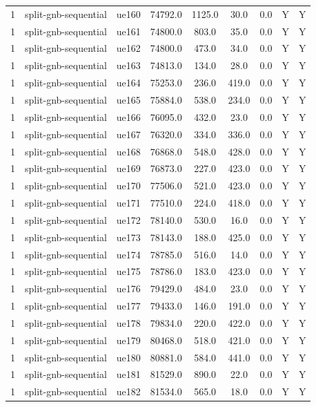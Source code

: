 \begin{table}[ht]
\begin{tabular}{|c|c|c|c|c|c|c|c|c|}
1 & split-gnb-sequential & ue160 & 74792.0 & 1125.0 & 30.0 & 0.0 & Y & Y \\
1 & split-gnb-sequential & ue161 & 74800.0 & 803.0 & 35.0 & 0.0 & Y & Y \\
1 & split-gnb-sequential & ue162 & 74800.0 & 473.0 & 34.0 & 0.0 & Y & Y \\
1 & split-gnb-sequential & ue163 & 74813.0 & 134.0 & 28.0 & 0.0 & Y & Y \\
1 & split-gnb-sequential & ue164 & 75253.0 & 236.0 & 419.0 & 0.0 & Y & Y \\
1 & split-gnb-sequential & ue165 & 75884.0 & 538.0 & 234.0 & 0.0 & Y & Y \\
1 & split-gnb-sequential & ue166 & 76095.0 & 432.0 & 23.0 & 0.0 & Y & Y \\
1 & split-gnb-sequential & ue167 & 76320.0 & 334.0 & 336.0 & 0.0 & Y & Y \\
1 & split-gnb-sequential & ue168 & 76868.0 & 548.0 & 428.0 & 0.0 & Y & Y \\
1 & split-gnb-sequential & ue169 & 76873.0 & 227.0 & 423.0 & 0.0 & Y & Y \\
1 & split-gnb-sequential & ue170 & 77506.0 & 521.0 & 423.0 & 0.0 & Y & Y \\
1 & split-gnb-sequential & ue171 & 77510.0 & 224.0 & 418.0 & 0.0 & Y & Y \\
1 & split-gnb-sequential & ue172 & 78140.0 & 530.0 & 16.0 & 0.0 & Y & Y \\
1 & split-gnb-sequential & ue173 & 78143.0 & 188.0 & 425.0 & 0.0 & Y & Y \\
1 & split-gnb-sequential & ue174 & 78785.0 & 516.0 & 14.0 & 0.0 & Y & Y \\
1 & split-gnb-sequential & ue175 & 78786.0 & 183.0 & 423.0 & 0.0 & Y & Y \\
1 & split-gnb-sequential & ue176 & 79429.0 & 484.0 & 23.0 & 0.0 & Y & Y \\
1 & split-gnb-sequential & ue177 & 79433.0 & 146.0 & 191.0 & 0.0 & Y & Y \\
1 & split-gnb-sequential & ue178 & 79834.0 & 220.0 & 422.0 & 0.0 & Y & Y \\
1 & split-gnb-sequential & ue179 & 80468.0 & 518.0 & 421.0 & 0.0 & Y & Y \\
1 & split-gnb-sequential & ue180 & 80881.0 & 584.0 & 441.0 & 0.0 & Y & Y \\
1 & split-gnb-sequential & ue181 & 81529.0 & 890.0 & 22.0 & 0.0 & Y & Y \\
1 & split-gnb-sequential & ue182 & 81534.0 & 565.0 & 18.0 & 0.0 & Y & Y \\

\end{tabular}
\end{table}
